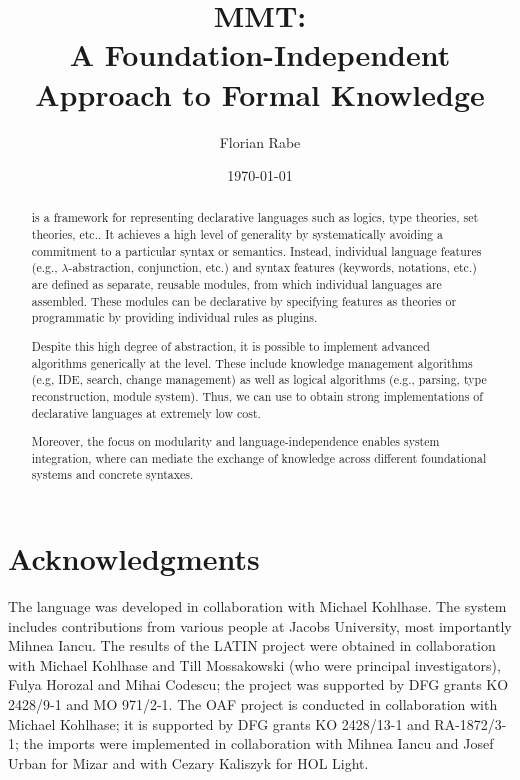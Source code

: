 \documentclass[12pt]{article}
\begin{document}
\author{Florian Rabe}
\title{MMT:\\ A Foundation-Independent Approach to Formal Knowledge}
\date{\today}
\maketitle

\begin{abstract}
\mmt is a framework for representing declarative languages such as logics, type theories, set theories, etc..
It achieves a high level of generality by systematically avoiding a commitment to a particular syntax or semantics.
Instead, individual language features (e.g., $\lambda$-abstraction, conjunction, etc.) and syntax features (keywords, notations, etc.) are defined as separate, reusable modules, from which individual languages are assembled.
These modules can be declarative by specifying features as \mmt theories or programmatic by providing individual rules as plugins.

Despite this high degree of abstraction, it is possible to implement advanced algorithms generically at the \mmt level.
These include knowledge management algorithms (e.g, IDE, search, change management) as well as logical algorithms (e.g., parsing, type reconstruction, module system).
Thus, we can use \mmt to obtain strong implementations of declarative languages at extremely low cost.

Moreover, the focus on modularity and language-independence enables system integration, where \mmt can mediate the exchange of knowledge across different foundational systems and concrete syntaxes.
\end{abstract}



\section*{Acknowledgments}

The \mmt language was developed in collaboration with Michael Kohlhase.
The \mmt system includes contributions from various people at Jacobs University, most importantly Mihnea Iancu.
The results of the LATIN project were obtained in collaboration with Michael Kohlhase and Till Mossakowski (who were principal investigators), Fulya Horozal and Mihai Codescu; the project was supported by DFG grants KO 2428/9-1 and MO 971/2-1.
The OAF project is conducted in collaboration with Michael Kohlhase; it is supported by DFG grants KO 2428/13-1 and RA-1872/3-1; the imports were implemented in collaboration with Mihnea Iancu and Josef Urban for Mizar and with Cezary Kaliszyk for HOL Light.



\end{document}
